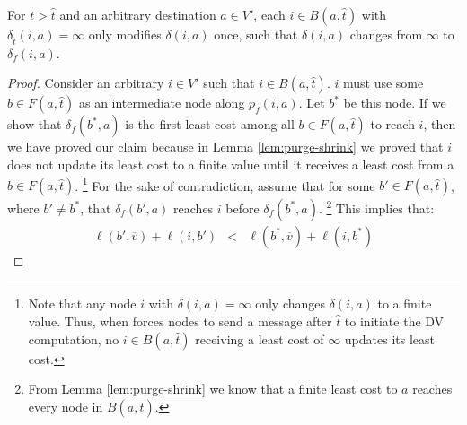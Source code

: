 {{\begin{theorem}
\label{thm:purge-oneupdate}
For $t > \hat{t}$ and an arbitrary destination $a \in V'$, each $i \in B(a,\hat{t})$ with $\delta_{\hat{t}}(i,a) = \infty$ only modifies $\delta(i,a)$ once,
such that $\delta(i,a)$ changes from $\infty$ to $\delta_f(i,a)$.
\end{theorem}
\begin{proof}
Consider an arbitrary $i \in V'$ such that $i \in B(a,\hat{t})$. $i$ must use some $b \in F(a,\hat{t})$ as an intermediate node along $p_f(i,a)$. %
Let $b^*$ be this node. %
If we show that $\delta_f(b^*,a)$ is the first least cost among all $b \in F(a,\hat{t})$ to reach $i$,
then we have proved our claim because in Lemma \ref{lem:purge-shrink} we proved that $i$ does not update its least cost to a finite value until it receives a least cost from a $b \in F(a,\hat{t})$.
{\footnote {\small  Note that any node $i$ with $\delta(i,a) = \infty$ only changes $\delta(i,a)$ to a finite value. Thus, when \purge forces 
nodes to send a message after $\hat{t}$ to initiate the DV computation, no $i \in B(a,\hat{t})$ receiving a least cost of $\infty$ updates its least cost.}}
For the sake of contradiction, assume that for some $b' \in F(a,\hat{t})$, where $b' \neq b^*$, that $\delta_f(b',a)$ reaches $i$ before $\delta_f(b^*,a)$. 
{\footnote {\small From Lemma \ref{lem:purge-shrink} we know that a finite least cost to $a$ reaches every node in $B(a,\hat{t})$.}}
This implies that:
\begin{eqnarray}
\label{eqn:fcont}
\ell(b',\overline{v}) + \ell(i,b')  &<& \ell(b^*,\overline{v}) + \ell(i,b^*) 
\end{eqnarray}


\end{proof}}}
